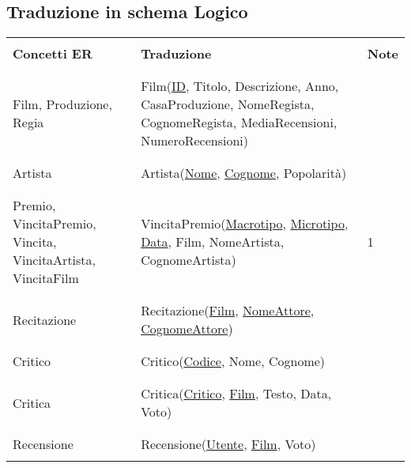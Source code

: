 \documentclass{article}
\begin{document}
\subsection{Traduzione in schema Logico}
%
%
%
\begin{tabular}{|C{2.7cm}|C{8cm}|C{0.8cm}|}
\hline
& & \\
    \textbf{Concetti ER} & \textbf{Traduzione} & \textbf{Note} \\
& & \\
\hline
& & \\
    Film, Produzione, Regia & Film(\underline{ID}, Titolo, Descrizione, Anno, CasaProduzione, NomeRegista, CognomeRegista, MediaRecensioni, NumeroRecensioni) & \\
& & \\
\hline
& & \\
    Artista & Artista(\underline{Nome}, \underline{Cognome}, Popolarità) & \\
& & \\
\hline
& & \\
    Premio, VincitaPremio, Vincita, VincitaArtista, VincitaFilm & VincitaPremio(\underline{Macrotipo}, \underline{Microtipo}, \underline{Data}, Film, NomeArtista, CognomeArtista) & 1 \\
& & \\
\hline
& & \\
    Recitazione & Recitazione(\underline{Film}, \underline{NomeAttore}, \underline{CognomeAttore}) & \\
& & \\
\hline
& & \\
    Critico & Critico(\underline{Codice}, Nome, Cognome) & \\
& & \\
\hline
& & \\
    Critica & Critica(\underline{Critico}, \underline{Film}, Testo, Data, Voto) & \\
& & \\
\hline
& & \\
    Recensione & Recensione(\underline{Utente}, \underline{Film}, Voto) & \\
& & \\
\hline 
\end{tabular} \\ \\
\end{document}
